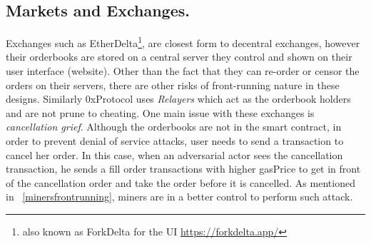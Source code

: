 



\subsection{Markets and Exchanges.} \label{sec:frontrunningExchanges}
Exchanges such as EtherDelta\footnote{also known as ForkDelta for the UI \url{https://forkdelta.app/}}, are closest form to decentral exchanges, however their orderbooks are stored on a central server they control and shown on their user interface (website). Other than the fact that they can re-order or censor the orders on their servers, there are other risks of front-running nature in these designs. Similarly 0xProtocol uses \textit{Relayers} which act as the orderbook holders and are not prune to cheating. One main issue with these exchanges is \textit{cancellation grief}. Although the orderbooks are not in the smart contract, in order to prevent denial of service attacks, user needs to send a transaction to cancel her order. In this case, when an adversarial actor sees the cancellation transaction, he sends a fill order transactions with higher gasPrice to get in front of the cancellation order and take the order before it is cancelled. As mentioned in ~\ref{minersfrontrunning}, miners are in a better control to perform such attack. 


